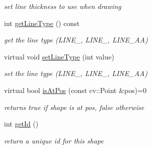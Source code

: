 \begin{DoxyCompactItemize}
\begin{DoxyCompactList}\small\item\em set line thickness to use when drawing \end{DoxyCompactList}\item 
int \hyperlink{classcanvascv_1_1Shape_a7345362b773e581d7e595e5662491231}{get\+Line\+Type} () const \hypertarget{classcanvascv_1_1Shape_a7345362b773e581d7e595e5662491231}{}\label{classcanvascv_1_1Shape_a7345362b773e581d7e595e5662491231}

\begin{DoxyCompactList}\small\item\em get the line type (L\+I\+N\+E\+\_, L\+I\+N\+E\+\_, L\+I\+N\+E\+\_\+\+AA) \end{DoxyCompactList}\item 
virtual void \hyperlink{classcanvascv_1_1Shape_a83195df4dc837a950462a314467b8114}{set\+Line\+Type} (int value)\hypertarget{classcanvascv_1_1Shape_a83195df4dc837a950462a314467b8114}{}\label{classcanvascv_1_1Shape_a83195df4dc837a950462a314467b8114}

\begin{DoxyCompactList}\small\item\em set the line type (L\+I\+N\+E\+\_, L\+I\+N\+E\+\_, L\+I\+N\+E\+\_\+\+AA) \end{DoxyCompactList}\item 
virtual bool \hyperlink{classcanvascv_1_1Shape_a801866696093d085433d6bf9f256d6f1}{is\+At\+Pos} (const cv\+::\+Point \&pos)=0\hypertarget{classcanvascv_1_1Shape_a801866696093d085433d6bf9f256d6f1}{}\label{classcanvascv_1_1Shape_a801866696093d085433d6bf9f256d6f1}

\begin{DoxyCompactList}\small\item\em returns true if shape is at pos, false otherwise \end{DoxyCompactList}\item 
int \hyperlink{classcanvascv_1_1Shape_a47d76edb7fe4316ce5f8e17a5c38c886}{get\+Id} ()\hypertarget{classcanvascv_1_1Shape_a47d76edb7fe4316ce5f8e17a5c38c886}{}\label{classcanvascv_1_1Shape_a47d76edb7fe4316ce5f8e17a5c38c886}

\begin{DoxyCompactList}\small\item\em return a unique id for this shape \end{DoxyCompactList}\end{DoxyCompactItemize}
